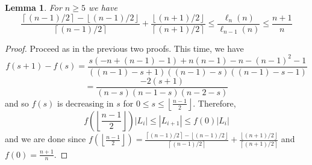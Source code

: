 \documentclass[11 pt]{article}
\newtheorem{lem}[equation]{Lemma}
\theoremstyle{definition}
\theoremstyle{case}
\numberwithin{equation}{section}
\begin{document}
\begin{lem}
\label{ration-1}
For $n\geq5$ we have 
\[\frac{\left\lceil (n-1)/2\right\rceil - \left\lfloor (n-1)/2\right\rfloor}{\left \lceil (n-1)/2\right\rceil} + \frac{\left\lfloor (n+1)/2\right\rfloor}{\left\lceil (n+1)/2\right\rceil}\leq \frac{\ell_{n}(n)}{\ell_{n-1}(n)}\leq \frac{n+1}{n}\]	
\end{lem}

\begin{proof}
Proceed as in the previous two proofs. This time, we have 
\[f(s+1)-f(s) =\frac{s(-n + (n-1) - 1) + n(n-1) - n -(n-1)^2-1}{((n-1)-s+1)((n-1)-s)((n-1)-s-1)}\]
\[=\frac{-2(s+1)}{(n-s)(n-1-s)(n-2-s)}\]
and so $f(s)$ is decreasing in $s$ for $0\leq s \leq \left\lfloor \frac{n-1}{2}\right\rfloor$. Therefore,
\[f\left(\left\lfloor \frac{n-1}{2}\right\rfloor\right)|L_i|\leq |L_{i+1}|\leq f(0)|L_i|\]
and we are done since $f\left(\left\lfloor \frac{n-1}{2}\right\rfloor\right) = \frac{\left\lceil (n-1)/2\right\rceil - \left\lfloor (n-1)/2\right\rfloor}{\left \lceil (n-1)/2\right\rceil} + \frac{\left\lfloor (n+1)/2\right\rfloor}{\left\lceil (n+1)/2\right\rceil}$ and $f(0) = \frac{n+1}{n}$. 
\end{proof}
\end{document}
